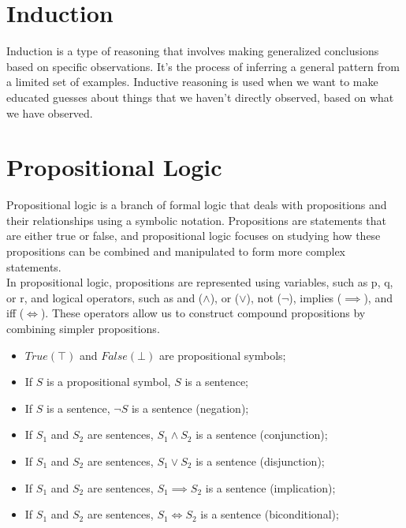 \documentclass{article}
\begin{document}
\section{Induction}

Induction is a type of reasoning that involves making generalized conclusions based on specific observations. It's the process of inferring a general pattern from a limited set of examples. Inductive reasoning is used when we want to make educated guesses about things that we haven't directly observed, based on what we have observed.

\newpage

\section{Propositional Logic}

Propositional logic is a branch of formal logic that deals with propositions and their relationships using a symbolic notation. Propositions are statements that are either true or false, and propositional logic focuses on studying how these propositions can be combined and manipulated to form more complex statements. \\

In propositional logic, propositions are represented using variables, such as p, q, or r, and logical operators, such as and ($\land$), or ($\lor$), not ($\neg$), implies ($\implies$), and iff ($\iff$). These operators allow us to construct compound propositions by combining simpler propositions.

\begin{itemize}
    \item $True (\top)$ and $False (\bot)$ are propositional symbols;
    \item If $S$ is a propositional symbol, $S$ is a sentence;
    \item If $S$ is a sentence, $\neg S$ is a sentence (negation);
    \item If $S_1$ and $S_2$ are sentences, $S_1 \land S_2$ is a sentence (conjunction);
    \item If $S_1$ and $S_2$ are sentences, $S_1 \lor S_2$ is a sentence (disjunction);
    \item If $S_1$ and $S_2$ are sentences, $S_1 \implies S_2$ is a sentence (implication);
    \item If $S_1$ and $S_2$ are sentences, $S_1 \iff S_2$ is a sentence (biconditional);
\end{itemize}
\end{document}
